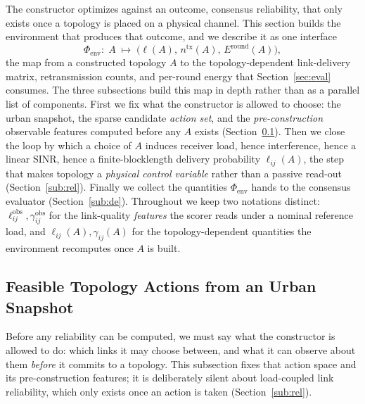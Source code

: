 \documentclass[journal]{IEEEtran}
\begin{document}
The constructor optimizes against an outcome, consensus reliability, that only
exists once a topology is placed on a physical channel. This section builds the
environment that produces that outcome, and we describe it as one interface
\begin{equation}
  \Phi_{\mathrm{env}}:\;A\;\longmapsto\;\big(\boldsymbol{\ell}(A),\,n^{\mathrm{tx}}(A),\,E^{\mathrm{round}}(A)\big),
  \label{eq:phienv}
\end{equation}
the map from a constructed topology $A$ to the topology-dependent link-delivery
matrix, retransmission counts, and per-round energy that Section~\ref{sec:eval}
consumes. The three subsections build this map in depth rather than as a parallel
list of components. First we fix what the constructor is allowed to choose: the
urban snapshot, the sparse candidate \emph{action set}, and the
\emph{pre-construction} observable features computed before any $A$ exists
(Section~\ref{sub:scene}). Then we close the loop by which a choice of $A$
induces receiver load, hence interference, hence a linear SINR, hence a
finite-blocklength delivery probability $\ell_{ij}(A)$, the step that makes
topology a \emph{physical control variable} rather than a passive read-out
(Section~\ref{sub:rel}). Finally we collect the quantities $\Phi_{\mathrm{env}}$
hands to the consensus evaluator (Section~\ref{sub:de}). Throughout we keep two
notations distinct: $\ell_{ij}^{\mathrm{obs}},\gamma_{ij}^{\mathrm{obs}}$ for
the link-quality \emph{features} the scorer reads under a nominal reference load,
and $\ell_{ij}(A),\gamma_{ij}(A)$ for the topology-dependent quantities the
environment recomputes once $A$ is built.

\subsection{Feasible Topology Actions from an Urban Snapshot}\label{sub:scene}

Before any reliability can be computed, we must say what the constructor is
allowed to do: which links it may choose between, and what it can observe about
them \emph{before} it commits to a topology. This subsection fixes that action
space and its pre-construction features; it is deliberately silent about
load-coupled link reliability, which only exists once an action is taken
(Section~\ref{sub:rel}).
\end{document}
